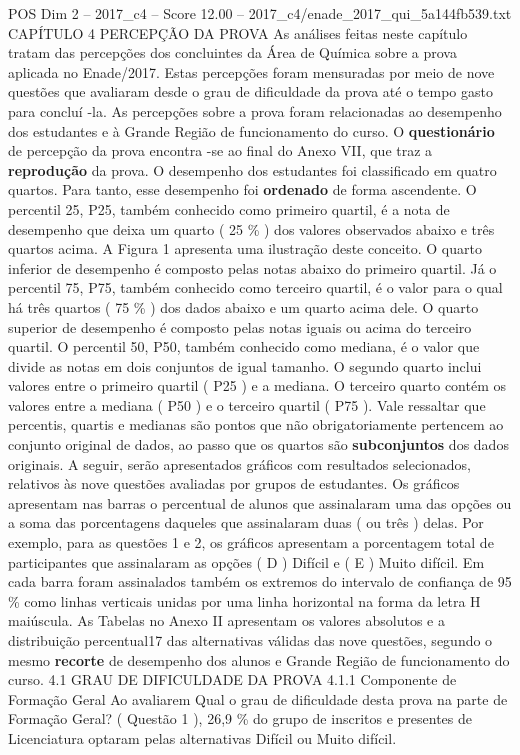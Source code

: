 \begin{textsample}{POS Dim 2 – 2017\_c4 – Score 12.00 – 2017\_c4/enade\_2017\_qui\_5a144fb539.txt}  \label{ex:f2_pos_091}
CAPÍTULO 4 PERCEPÇÃO DA PROVA As análises feitas neste capítulo tratam das percepções dos concluintes da Área de Química sobre a prova aplicada no Enade/2017.
Estas percepções foram mensuradas por meio de nove questões que avaliaram desde o grau de dificuldade da prova até o tempo gasto para concluí -la.
As percepções sobre a prova foram relacionadas ao desempenho dos estudantes e à Grande Região de funcionamento do curso.
O \textbf{questionário} de percepção da prova encontra -se ao final do Anexo VII, que traz a \textbf{reprodução} da prova.
O desempenho dos estudantes foi classificado em quatro quartos.
Para tanto, esse desempenho foi \textbf{ordenado} de forma ascendente.
O percentil 25, P25, também conhecido como primeiro quartil, é a nota de desempenho que deixa um quarto ( 25 \% ) dos valores observados abaixo e três quartos acima.
A Figura 1 apresenta uma ilustração deste conceito.
O quarto inferior de desempenho é composto pelas notas abaixo do primeiro quartil.
Já o percentil 75, P75, também conhecido como terceiro quartil, é o valor para o qual há três quartos ( 75 \% ) dos dados abaixo e um quarto acima dele.
O quarto superior de desempenho é composto pelas notas iguais ou acima do terceiro quartil.
O percentil 50, P50, também conhecido como mediana, é o valor que divide as notas em dois conjuntos de igual tamanho.
O segundo quarto inclui valores entre o primeiro quartil ( P25 ) e a mediana.
O terceiro quarto contém os valores entre a mediana ( P50 ) e o terceiro quartil ( P75 ).
Vale ressaltar que percentis, quartis e medianas são pontos que não obrigatoriamente pertencem ao conjunto original de dados, ao passo que os quartos são \textbf{subconjuntos} dos dados originais.
A seguir, serão apresentados gráficos com resultados selecionados, relativos às nove questões avaliadas por grupos de estudantes.
Os gráficos apresentam nas barras o percentual de alunos que assinalaram uma das opções ou a soma das porcentagens daqueles que assinalaram duas ( ou três ) delas.
Por exemplo, para as questões 1 e 2, os gráficos apresentam a porcentagem total de participantes que assinalaram as opções ( D ) Difícil e ( E ) Muito difícil.
Em cada barra foram assinalados também os extremos do intervalo de confiança de 95 \% como linhas verticais unidas por uma linha horizontal na forma da letra H maiúscula.
As Tabelas no Anexo II apresentam os valores absolutos e a distribuição percentual17 das alternativas válidas das nove questões, segundo o mesmo \textbf{recorte} de desempenho dos alunos e Grande Região de funcionamento do curso. 4.1 GRAU DE DIFICULDADE DA PROVA 4.1.1 Componente de Formação Geral Ao avaliarem Qual o grau de dificuldade desta prova na parte de Formação Geral? ( Questão 1 ), 26,9 \% do grupo de inscritos e presentes de Licenciatura optaram pelas alternativas Difícil ou Muito difícil.

\end{textsample}
